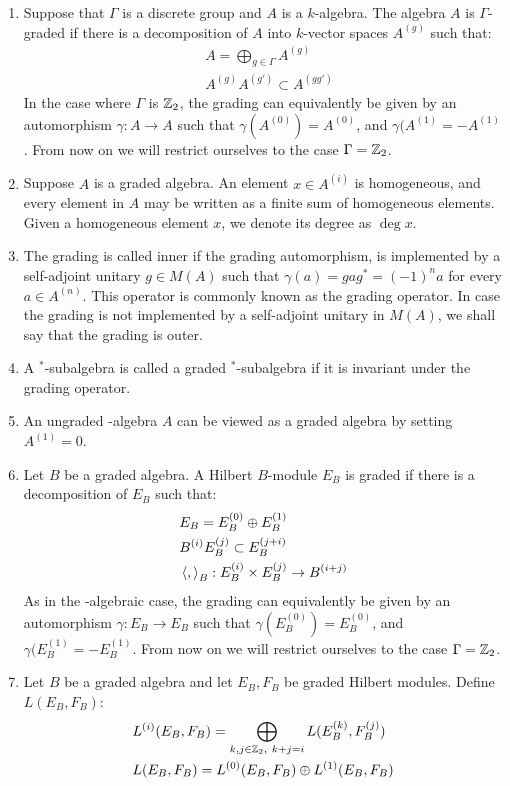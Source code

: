 \begin{definition}
\begin{enumerate}
\item Suppose that $\Gamma$ is a discrete group and $A$ is a $k$-algebra. The algebra $A$ is $\Gamma$-graded if there is a decomposition of $A$ into $k$-vector spaces $A^{(g)}$ such that:
\begin{align*}
	&A=\bigoplus_{g \in \Gamma} A^{(g)} \\
	&A^{(g)} A^{(g')}\subset A^{(g g')}
\end{align*}
In the case where $\Gamma$ is $\mathbb{Z}_2$, the grading can equivalently be given by an automorphism $\gamma:A\to A$ such that $\gamma(A^{(0)})=A^{(0)}$, and $\gamma(A^{(1)}=-A^{(1)}$. From now on we will restrict ourselves to the case $\Gamma=\mathbb{Z}_2$.  
\item	Suppose $A$ is a graded \Cstar algebra. An element $x\in A^{(i)}$ is homogeneous, and every element in $A$ may be written as a finite sum of homogeneous elements. Given a homogeneous element $x$, we denote its degree as $\deg x$. 
\item	The grading is called inner if the grading automorphism, is implemented by a self-adjoint unitary $g\in M(A)$ such that $\gamma(a)=gag^*=(-1)^n a$ for every $a\in A^{(n)}$. This operator is commonly known as the grading operator. In case the grading is not implemented by a self-adjoint unitary in $M(A)$, we shall say that the grading is outer. 
\item 	 A $^*$-subalgebra is called a graded $^*$-subalgebra if it is invariant under the grading operator.
\item	 An ungraded \Cstar-algebra $A$ can be viewed as a graded algebra by setting $A^{(1)}=0$.  
\item 	 Let $B$ be a graded \Cstar algebra. A Hilbert $B$-module $E_B$ is graded if there is a decomposition of $E_B$ such that:
	\begin{align*}
		&E_B=E_B^{(0)}\oplus E_B^{(1)} \\
		&B^{(i)}E_B^{(j)}\subset E_B^{(j+i)} \\
		&\left \langle , \right \rangle_B:E_B^{(i)}\times E_B^{(j)}\to B^{(i+j)}
	\end{align*}
	As in the \Cstar-algebraic case, the grading can equivalently be given by an automorphism $\gamma:E_B\to E_B$ such that $\gamma(E_B^{(0)})=E_B^{(0)}$, and $\gamma(E_B^{(1)}=-E_B^{(1)}$. From now on we will restrict ourselves to the case $\Gamma=\mathbb{Z}_2$. 
\item 	 Let $B$ be a graded \Cstar algebra and let $E_B,F_B$ be graded Hilbert modules. Define $L(E_B,F_B)$:
	\begin{align*}
		&L^{(i)}(E_B,F_B)=\bigoplus_{k,j \in \mathbb{Z}_2,~k+j=i} L(E_B^{(k)},F_B^{(j)}) \\
		&L(E_B,F_B)=L^{(0)}(E_B,F_B)\oplus L^{(1)}(E_B,F_B)
	\end{align*}
\end{enumerate}
\end{definition}

